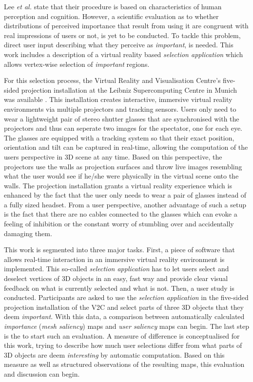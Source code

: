 Lee \textit{et al.} state that their procedure is based on characteristics of human perception and cognition. However, a scientific evaluation as to whether distributions of perceived importance that result from using it are congruent with real impressions of users or not, is yet to be conducted. To tackle this problem, direct user input describing what they perceive as \textit{important}, is needed. This work includes a description of a virtual reality based \textit{selection application} which allows vertex-wise selection of \textit{important} regions.

For this selection process, the Virtual Reality and Visualisation Centre's five-sided projection installation at the Leibniz Supercomputing Centre in Munich was available \cite{v2c}. This installation creates interactive, immersive virtual reality environments via multiple projectors and tracking sensors. Users only need to wear a lightweight pair of stereo shutter glasses that are synchronised with the projectors and thus can seperate two images for the spectator, one for each eye. The glasses are equipped with a tracking system so that their exact position, orientation and tilt can be captured in real-time, allowing the computation of the users perspective in 3D scene at any time. Based on this perspective, the projectors use the walls as projection surfaces and throw live images resembling what the user would see if he/she were physically in the virtual scene onto the walls. The projection installation grants a virtual reality experience which is enhanced by the fact that the user only needs to wear a pair of glasses instead of a fully sized headset. From a user perspective, another advantage of such a setup is the fact that there are no cables connected to the glasses which can evoke a feeling of inhibition or the constant worry of stumbling over and accidentally damaging them.

This work is segmented into three major tasks. First, a piece of software that allows real-time interaction in an immersive virtual reality environment is implemented. This so-called \textit{selection application} has to let users select and deselect vertices of 3D objects in an easy, fast way and provide clear visual feedback on what is currently selected and what is not. Then, a user study is conducted. Participants are asked to use the \textit{selection application} in the five-sided projection installation of the V2C \cite{v2c} and select parts of three 3D objects that they deem \textit{important}. With this data, a comparison between automatically calculated \textit{importance} (\textit{mesh saliency}) maps and \textit{user saliency} maps can begin. The last step is the to start such an evaluation. A measure of difference is conceptualised for this work, trying to describe how much user selections differ from what parts of 3D objects are deem \textit{interesting} by automatic computation. Based on this measure as well as structured observations of the resulting maps, this evaluation and discussion can begin.

